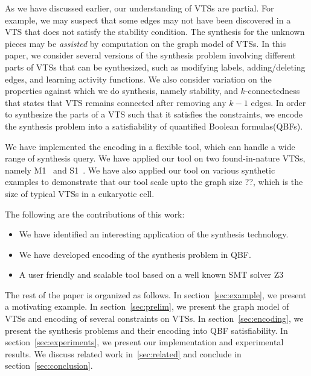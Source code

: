 %
As we have discussed earlier, our understanding of VTSs are partial.
%
%
%
For example, we may suspect that some edges may not have been
discovered in a VTS that does not satisfy the stability condition.
%
The synthesis for the unknown pieces may be {\em assisted} by computation on
the graph model of VTSs.
%
In this paper, we consider several versions of the synthesis problem
involving different parts of VTSs that can be synthesized, such as
modifying labels, adding/deleting edges, and learning activity functions.
%
We also consider variation on the properties against which we do
synthesis, namely stability, and $k$-connectedness that states that
VTS remains connected after removing any $k-1$ edges.
%
In order to synthesize the parts of a VTS such that it satisfies the
constraints, we encode the synthesis problem into a satisfiability of
quantified Boolean formulas(QBFs). 
%

We have implemented the encoding in a flexible tool,
which can handle a wide range of synthesis query.
%
We have applied our tool on two found-in-nature VTSs, namely
M1~\cite{} and S1~\cite{}.
%
We have also applied our tool on various synthetic examples to
demonstrate that our tool scale upto the graph size ??, which
is the size of typical VTSs in a eukaryotic cell.

The following are the contributions of this work:
\begin{itemize}
\item We have identified an interesting application of
  the synthesis technology.
\item We have developed encoding of the synthesis problem in QBF.
\item A user friendly and scalable tool based on a well known SMT solver Z3
\end{itemize}

The rest of the paper is organized as follows.
%
In section~\ref{sec:example}, we present a motivating example.
%
In section~\ref{sec:prelim}, we present the graph model of VTSs and encoding of several
constraints on VTSs.
%
In section~\ref{sec:encoding}, we present the synthesis problems and their
encoding into QBF satisfiability.
%
In section~\ref{sec:experiments}, we present our implementation and experimental results.
%
We discuss related work in~\ref{sec:related} and conclude in section~\ref{sec:conclusion}.



